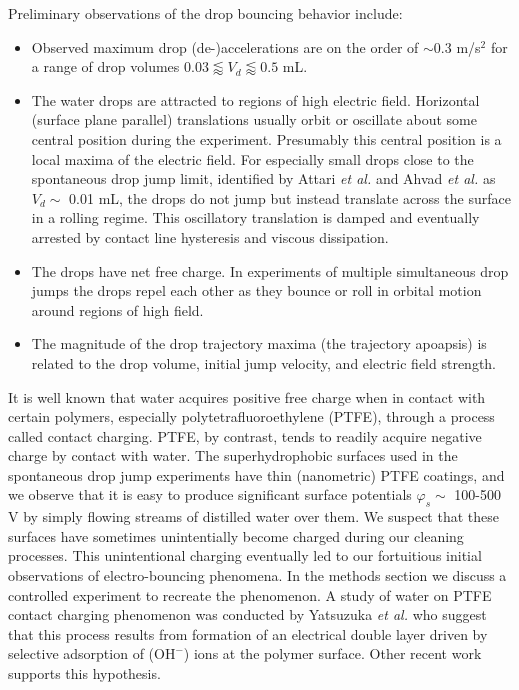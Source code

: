 \documentclass[aip,reprint, floatfix]{revtex4-1}
\begin{document}
Preliminary observations of the drop bouncing behavior include:
\begin{itemize}
\item Observed maximum drop (de-)accelerations are on the order of $\sim$0.3 m/s$^2$ for a range of drop volumes $0.03 \lessapprox V_d \lessapprox 0.5$ mL.
\item The water drops are attracted to regions of high electric field. Horizontal (surface plane parallel) translations usually orbit or oscillate about some central position during the experiment. Presumably this central position is a local maxima of the electric field. For especially small drops close to the spontaneous drop jump limit, identified by Attari \emph{et al.} \citep{attari_puddle_2016} and Ahvad \emph{et al.} \citep{avhad_numerical_2020} as $V_d \sim$ 0.01 mL, the drops do not jump but instead translate across the surface in a rolling regime. This oscillatory translation is damped and eventually arrested by contact line hysteresis and viscous dissipation.
\item The drops have net free charge. In experiments of multiple simultaneous drop jumps the drops repel each other as they bounce or roll in orbital motion around regions of high field.
\item The magnitude of the drop trajectory maxima (the trajectory apoapsis) is related to the drop volume, initial jump velocity, and electric field strength.
\end{itemize}

It is well known that water acquires positive free charge when in contact with certain polymers, especially polytetrafluoroethylene (PTFE), through a process called contact charging. \cite{langmuir_surface_1938} PTFE, by contrast, tends to readily acquire negative charge by contact with water. The superhydrophobic surfaces used in the spontaneous drop jump experiments have thin (nanometric) PTFE coatings, and we observe that it is easy to produce significant surface potentials $\varphi_s \sim$ 100-500 V by simply flowing streams of distilled water over them. We suspect that these surfaces have sometimes unintentially become charged during our cleaning processes. This unintentional charging eventually led to our fortuitious initial observations of electro-bouncing phenomena. In the methods section we discuss a controlled experiment to recreate the phenomenon. A study of water on PTFE contact charging phenomenon was conducted by Yatsuzuka \emph{et al.} \cite{yatsuzuka_electrification_1994} who suggest that this process results from formation of an electrical double layer driven by selective adsorption of ($\mbox{OH}^-$) ions at the polymer surface. Other recent work supports this hypothesis. \cite{beattie_intrinsic_2006, strazdaite_water_2015} 
\end{document}
